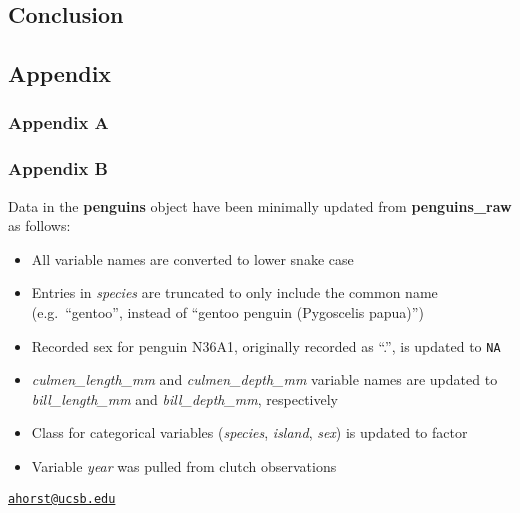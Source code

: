 \hypertarget{conclusion}{%
\subsection{Conclusion}\label{conclusion}}

\hypertarget{appendix}{%
\subsection{Appendix}\label{appendix}}

\hypertarget{appendix-a}{%
\subsubsection{Appendix A}\label{appendix-a}}

\hypertarget{appendix-b}{%
\subsubsection{Appendix B}\label{appendix-b}}

Data in the \textbf{penguins} object have been minimally updated from
\textbf{penguins\_raw} as follows:

\begin{itemize}
\tightlist
\item
  All variable names are converted to lower snake case
\item
  Entries in \emph{species} are truncated to only include the common
  name (e.g.~``gentoo'', instead of ``gentoo penguin (Pygoscelis
  papua)'')
\item
  Recorded sex for penguin N36A1, originally recorded as ``.'', is
  updated to \texttt{NA}
\item
  \emph{culmen\_length\_mm} and \emph{culmen\_depth\_mm} variable names
  are updated to \emph{bill\_length\_mm} and \emph{bill\_depth\_mm},
  respectively
\item
  Class for categorical variables (\emph{species}, \emph{island},
  \emph{sex}) is updated to factor
\item
  Variable \emph{year} was pulled from clutch observations
\end{itemize}




\address{%
Allison M. Horst\\
Bren School of Environmental Science and Management\\
University of California, Santa Barbara\\ Santa Barbara, CA 93106-5131\\
}
\href{mailto:ahorst@ucsb.edu}{\nolinkurl{ahorst@ucsb.edu}}

